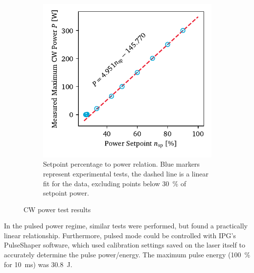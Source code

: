 \begin{figure}[h]
\begin{subfigure}[t]{3.1in}
                    \includegraphics[width=\textwidth]{assets/3 design/cw_power_setpoint.pdf}
                    \caption{Setpoint percentage to power relation. Blue markers represent experimental tests, the dashed line is a linear fit for the data, excluding points below 30~\% of setpoint power.}
                    \label{fig:cw_tests_setpoint}
                \end{subfigure}
                \caption{CW power test results}
                \label{fig:cw_tests}
            \end{figure}

            In the pulsed power regime, similar tests were performed, but found a practically linear relationship. Furthermore, pulsed mode could be controlled with IPG's PulseShaper software, which used calibration settings saved on the laser itself to accurately determine the pulse power/energy. The maximum pulse energy (100~\% for \qty{10}{ms}) was \qty{30.8}{J}.

